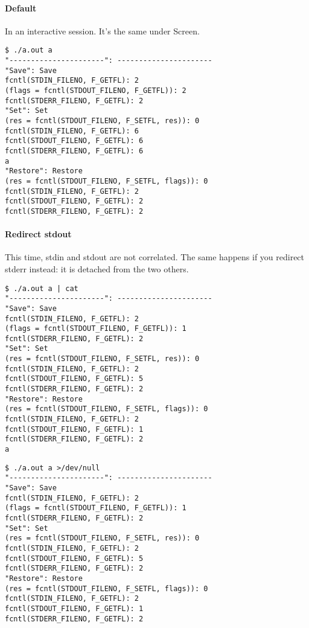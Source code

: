 \documentclass[openright,twoside,11pt]{book}
\begin{document}


\paragraph{Default}
In an interactive session.  It's the same under Screen.
\begin{lstlisting}
$ ./a.out a
"----------------------": ----------------------
"Save": Save
fcntl(STDIN_FILENO, F_GETFL): 2
(flags = fcntl(STDOUT_FILENO, F_GETFL)): 2
fcntl(STDERR_FILENO, F_GETFL): 2
"Set": Set
(res = fcntl(STDOUT_FILENO, F_SETFL, res)): 0
fcntl(STDIN_FILENO, F_GETFL): 6
fcntl(STDOUT_FILENO, F_GETFL): 6
fcntl(STDERR_FILENO, F_GETFL): 6
a
"Restore": Restore
(res = fcntl(STDOUT_FILENO, F_SETFL, flags)): 0
fcntl(STDIN_FILENO, F_GETFL): 2
fcntl(STDOUT_FILENO, F_GETFL): 2
fcntl(STDERR_FILENO, F_GETFL): 2
\end{lstlisting}

\paragraph{Redirect stdout}
This time, stdin and stdout are not correlated.  The same happens if you
redirect stderr instead: it is detached from the two others.

\begin{lstlisting}
$ ./a.out a | cat
"----------------------": ----------------------
"Save": Save
fcntl(STDIN_FILENO, F_GETFL): 2
(flags = fcntl(STDOUT_FILENO, F_GETFL)): 1
fcntl(STDERR_FILENO, F_GETFL): 2
"Set": Set
(res = fcntl(STDOUT_FILENO, F_SETFL, res)): 0
fcntl(STDIN_FILENO, F_GETFL): 2
fcntl(STDOUT_FILENO, F_GETFL): 5
fcntl(STDERR_FILENO, F_GETFL): 2
"Restore": Restore
(res = fcntl(STDOUT_FILENO, F_SETFL, flags)): 0
fcntl(STDIN_FILENO, F_GETFL): 2
fcntl(STDOUT_FILENO, F_GETFL): 1
fcntl(STDERR_FILENO, F_GETFL): 2
a
\end{lstlisting}

\begin{lstlisting}
$ ./a.out a >/dev/null
"----------------------": ----------------------
"Save": Save
fcntl(STDIN_FILENO, F_GETFL): 2
(flags = fcntl(STDOUT_FILENO, F_GETFL)): 1
fcntl(STDERR_FILENO, F_GETFL): 2
"Set": Set
(res = fcntl(STDOUT_FILENO, F_SETFL, res)): 0
fcntl(STDIN_FILENO, F_GETFL): 2
fcntl(STDOUT_FILENO, F_GETFL): 5
fcntl(STDERR_FILENO, F_GETFL): 2
"Restore": Restore
(res = fcntl(STDOUT_FILENO, F_SETFL, flags)): 0
fcntl(STDIN_FILENO, F_GETFL): 2
fcntl(STDOUT_FILENO, F_GETFL): 1
fcntl(STDERR_FILENO, F_GETFL): 2
\end{lstlisting}
\end{document}
